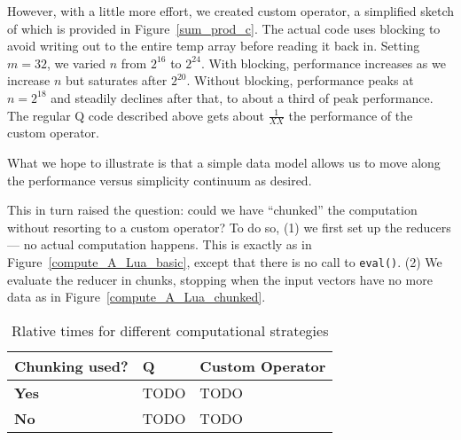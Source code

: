 However, with a little more effort, we created custom operator, 
a simplified sketch of which is provided in Figure~\ref{sum_prod_c}. The actual code
uses blocking to avoid writing out to the entire temp array before reading it
back in. Setting \(m=32\), we varied \(n\) from \(2^{16}\) to \(2^{24}\). With
blocking, performance increases as we increase \(n\) but saturates after
\(2^{20}\). Without blocking, performance peaks at \(n=2^{18}\) and steadily
declines after that, to about a third of peak performance.
The regular Q code described above gets about
\(\frac{1}{XX}\) the performance of the custom operator. 

What we hope to illustrate is that a
simple data model allows us to move along the performance versus simplicity
continuum as desired.

\begin{figure}
\centering
{}
\end{figure}

This in turn raised the question: could we have ``chunked'' the computation 
without resorting to a custom operator? To do so, (1)
we first set up the reducers --- no actual
computation happens. This is exactly as in Figure~\ref{compute_A_Lua_basic}, except that there is no call to
{\tt eval()}. (2) We evaluate the reducer in chunks, stopping
when the input vectors have no more data as in
Figure~\ref{compute_A_Lua_chunked}.
\begin{figure}
\centering
{}
\end{figure}

\begin{table}
  \centering
  \begin{tabular}{|l|l|l|} \hline \hline
    {\bf Chunking used?}    & {\bf Q} & {\bf Custom Operator} \\ \hline \hline
    {\bf Yes} & TODO & TODO \\ \hline
    {\bf No} & TODO & TODO \\ \hline
    \hline
  \end{tabular}
  \caption{Rlative times for different computational strategies}
\end{table}
